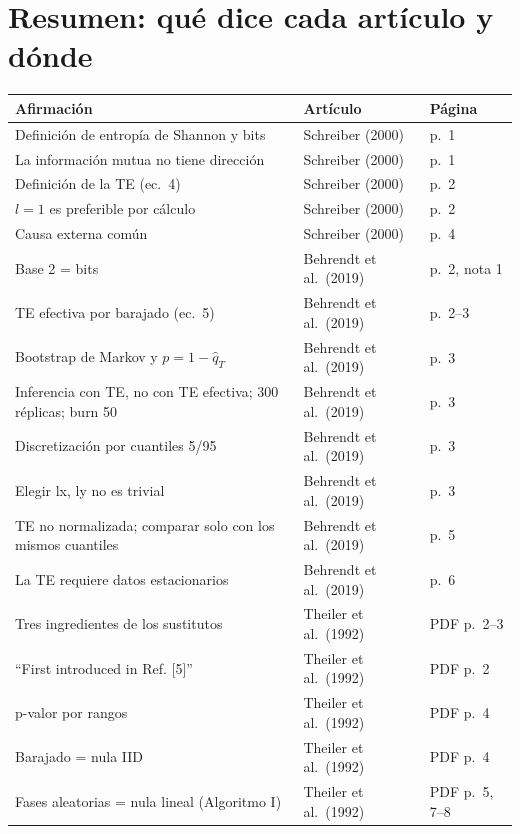 \documentclass[11pt,openany]{book}
\begin{document}
\appendix
\chapter{Resumen: qué dice cada artículo y dónde}

\begin{center}\small
\begin{longtable}{>{\raggedright}p{6.4cm}>{\raggedright}p{3.6cm}>{\raggedright\arraybackslash}p{4.2cm}}
\toprule
Afirmación & Artículo & Página \\
\midrule
\endhead
Definición de entropía de Shannon y bits & Schreiber (2000) & p.~1 \\
La información mutua no tiene dirección & Schreiber (2000) & p.~1 \\
Definición de la TE (ec.~4) & Schreiber (2000) & p.~2 \\
$l = 1$ es preferible por cálculo & Schreiber (2000) & p.~2 \\
Causa externa común & Schreiber (2000) & p.~4 \\
Base 2 = bits & Behrendt et al.\ (2019) & p.~2, nota 1 \\
TE efectiva por barajado (ec.~5) & Behrendt et al.\ (2019) & p.~2--3 \\
Bootstrap de Markov y $p = 1 - \hat q_T$ & Behrendt et al.\ (2019) & p.~3 \\
Inferencia con TE, no con TE efectiva; 300 réplicas; burn 50 & Behrendt et al.\ (2019) & p.~3 \\
Discretización por cuantiles 5/95 & Behrendt et al.\ (2019) & p.~3 \\
Elegir lx, ly no es trivial & Behrendt et al.\ (2019) & p.~3 \\
TE no normalizada; comparar solo con los mismos cuantiles & Behrendt et al.\ (2019) & p.~5 \\
La TE requiere datos estacionarios & Behrendt et al.\ (2019) & p.~6 \\
Tres ingredientes de los sustitutos & Theiler et al.\ (1992) & PDF p.~2--3 \\
``First introduced in Ref. [5]'' & Theiler et al.\ (1992) & PDF p.~2 \\
p-valor por rangos & Theiler et al.\ (1992) & PDF p.~4 \\
Barajado = nula IID & Theiler et al.\ (1992) & PDF p.~4 \\
Fases aleatorias = nula lineal (Algoritmo I) & Theiler et al.\ (1992) & PDF p.~5, 7--8 \\

\end{longtable}
\end{center}
\end{document}
